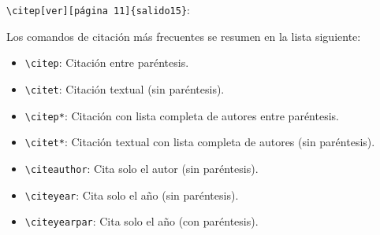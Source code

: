 \documentclass[11pt,a4paper]{article}
\begin{document}
   \verb+\citep[ver][página 11]{salido15}+: \citep[ver][página 5]{salido15} 

\newpage
Los comandos de citación más frecuentes se resumen en la lista siguiente:

\begin{itemize}
    \item \verb+\citep+: Citación entre paréntesis.
    \item \verb+\citet+: Citación textual (sin paréntesis).
    \item \verb+\citep*+: Citación con lista completa de autores entre paréntesis.
    \item \verb+\citet*+: Citación textual con lista completa de autores (sin paréntesis).
    \item \verb+\citeauthor+: Cita solo el autor (sin paréntesis).
    \item \verb+\citeyear+: Cita solo el año (sin paréntesis).
    \item \verb+\citeyearpar+: Cita solo el año (con paréntesis).
\end{itemize}

\renewcommand{\refname}{Bibliografía} %



\end{document}
